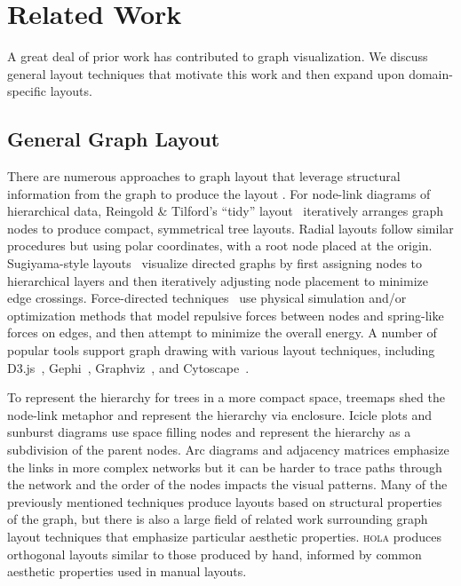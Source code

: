 \section{Related Work}

A great deal of prior work has contributed to graph visualization.
We discuss general layout techniques that motivate this work and
then expand upon domain-specific layouts.

\subsection{General Graph Layout}
There are numerous approaches to graph layout that leverage structural
information from the graph to produce the layout \cite{herman2000graph,eades2010graph,gibson2013survey}.
For node-link diagrams of hierarchical data, Reingold \& Tilford's ``tidy'' 
layout~\cite{reingold1981tidier} iteratively arranges graph nodes to
produce compact, symmetrical tree layouts.
Radial layouts  follow similar procedures but using polar coordinates, with a root node placed at the origin.
Sugiyama-style layouts~\cite{sugiyama1981methods} visualize directed graphs by first assigning nodes to hierarchical layers and then iteratively adjusting node placement to minimize edge crossings.
Force-directed techniques~\cite{tutte1963draw,kobourov2012spring,quinn1979forced,fruchterman1991graph} 
use physical simulation and/or optimization methods that model repulsive forces between nodes and spring-like forces on edges, and then attempt to minimize the overall energy. 
A number of popular tools support graph drawing with various layout 
techniques, including D3.js~\cite{bostock:d3}, Gephi~\cite{bastian2009gephi},
Graphviz~\cite{ellson2001graphviz}, and Cytoscape~\cite{shannon2003cytoscape}.

To represent the hierarchy for trees in a more compact space, treemaps \cite{johnson1991tree}
shed the node-link metaphor and represent the hierarchy via enclosure. 
Icicle plots \cite{kruskal1983icicle} and sunburst diagrams  
use space filling nodes and represent the hierarchy as a subdivision of the parent nodes.
Arc diagrams  and adjacency matrices 
emphasize the links in more complex networks but it can be harder to trace
paths through the network and the order of the nodes impacts the visual 
patterns.
Many of the previously mentioned techniques produce layouts based on structural
properties of the graph, but there is also a large field of 
related work surrounding graph layout techniques that emphasize particular
aesthetic properties. \textsc{hola} \cite{kieffer2016hola} produces orthogonal 
layouts similar to those produced by hand, informed by common aesthetic properties 
used in manual layouts.


